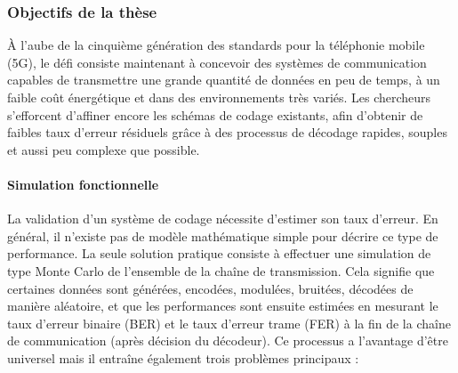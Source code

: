\subsubsection*{Objectifs de la thèse}

À l'aube de la cinquième génération des standards pour la téléphonie mobile
(5G), le défi consiste maintenant à concevoir des systèmes de communication
capables de transmettre une grande quantité de données en peu de temps, à un
faible coût énergétique et dans des environnements très variés. Les chercheurs
s'efforcent d'affiner encore les schémas de codage existants, afin d'obtenir de
faibles taux d'erreur résiduels grâce à des processus de décodage rapides,
souples et aussi peu complexe que possible.

\paragraph{Simulation fonctionnelle}

La validation d'un système de codage nécessite d'estimer son taux d'erreur. En
général, il n'existe pas de modèle mathématique simple pour décrire ce type de
performance. La seule solution pratique consiste à effectuer une simulation
de type Monte Carlo de l'ensemble de la chaîne de transmission. Cela signifie
que certaines données sont générées, encodées, modulées, bruitées, décodées de
manière aléatoire, et que les performances sont ensuite estimées en mesurant le
taux d'erreur binaire (BER) et le taux d'erreur trame (FER) à la fin de la
chaîne de communication (après décision du décodeur). Ce processus a l'avantage
d'être universel mais il entraîne également trois problèmes principaux :

